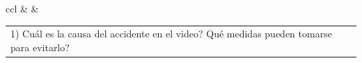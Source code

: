 \begin{table}[ht]
{\begin{tabular}{ccl}
&  &
\begin{tabular}[c]{@{}l@{}}
1) \textquestiondown Cuál es la causa del accidente en el video? \textquestiondown Qué medidas pueden tomarse para evitarlo?
\end{tabular} \\ \hline

\end{tabular}%
}

\label{app:tab:task_templates}
\end{table}
